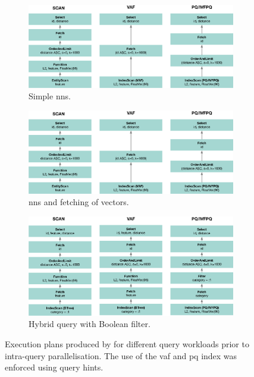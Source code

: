 \begin{figure}[p]
    \centering
    \begin{subfigure}[b]{\textwidth}
        \centering
        \includegraphics[width=\textwidth]{figures/bignns/cottontail/query-plan-nns}
        \caption{Simple \acrshort{nns}.}
        \label{figure:cottontail_nns_plan}
    \end{subfigure}
    \hfill
    \centering
    \begin{subfigure}[b]{\textwidth}
        \centering
        \includegraphics[width=\textwidth]{figures/bignns/cottontail/query-plan-nns}
        \caption{\acrshort{nns} and fetching of vectors.}
        \label{figure:cottontail_nns_fetch_plan}
    \end{subfigure}
    \hfill
    \centering
    \begin{subfigure}[b]{\textwidth}
        \centering
        \includegraphics[width=\textwidth]{figures/bignns/cottontail/query-plan-hybrid}
        \caption{Hybrid query with Boolean filter.}
        \label{figure:cottontail_hybrid_plan}
    \end{subfigure}
    \caption{Execution plans produced by \cottontail{} for different query workloads prior to intra-query parallelisation. The use of the \acrshort{vaf} and \acrshort{pq} index was enforced using query hints.}
    \label{figure:cottontail_plans}
\end{figure}

